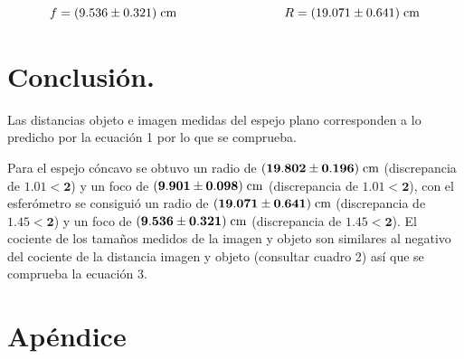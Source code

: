 \documentclass[DIV=calc, paper=a4, fontsize=11pt]{scrartcl}
\begin{document}
\begin{equation*}
    f = (9.536 \pm 0.321) \hspace{0.1cm} \text{cm} \hspace{3cm} R = (19.071 \pm 0.641) \hspace{0.1cm} \text{cm}
\end{equation*}


\section*{\textcolor{carmine}{Conclusión.}}
\nocite{*}

Las distancias objeto e imagen medidas del espejo plano corresponden a lo predicho por la ecuación 1 por lo que se comprueba.

Para el espejo cóncavo se obtuvo un radio de $\mathbf{(19.802 \pm 0.196)\hspace{0.1cm} \text{cm}}$ (discrepancia de $\mathbf{1.01<2}$) y un foco de $\mathbf{(9.901 \pm 0.098)\hspace{0.1cm} \text{cm}}$ (discrepancia de $\mathbf{1.01 < 2}$), con el esferómetro se consiguió un radio de $\mathbf{(19.071 \pm 0.641)\hspace{0.1cm} \text{cm}}$ (discrepancia de $\mathbf{1.45<2}$) y un foco de $\mathbf{(9.536 \pm 0.321)\hspace{0.1cm} \text{cm}}$ (discrepancia de $\mathbf{1.45<2}$). El cociente de los tamaños medidos de la imagen y objeto son similares al negativo del cociente de la distancia imagen y objeto (consultar cuadro 2) así que se comprueba la ecuación 3.

\newpage
\section*{\textcolor{carmine}{Apéndice}}
\end{document}
